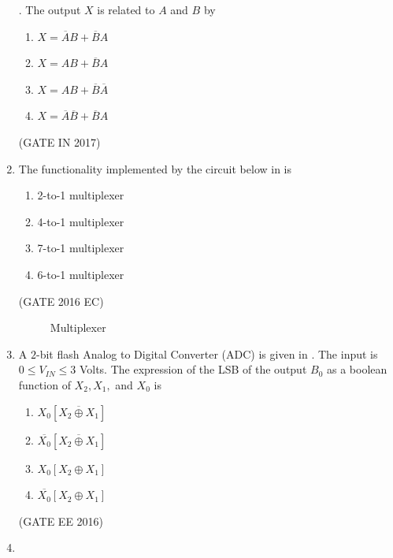 \begin{enumerate}[label=\arabic*.,ref=\theenumi]
.
	The output $X$ is related to $A$ and $B$ by 
\begin{enumerate}
\item $X = \overline{A}B + \overline{B}A$
\item $X = AB + \overline{B}A$
\item $X = AB + \overline{B}\overline{A}$
\item $X = \overline{A}\overline{B} + \overline{B}A$
\end{enumerate}
\hfill (GATE IN 2017)
\begin{figure}[H]
\centering
\resizebox{0.75\columnwidth}{!}{%

	}
\caption{}
\label{fig:gate_in_2017_30}
\end{figure}
\item The functionality implemented by the circuit below 
in
	is 
\begin{enumerate}
\item 2-to-1 multiplexer
\item 4-to-1 multiplexer
\item 7-to-1 multiplexer
\item 6-to-1 multiplexer
\end{enumerate}
\hfill (GATE 2016 EC)
%
\begin{figure}[H]
\centering
\resizebox{0.5\columnwidth}{!}{%

	}
\caption{Multiplexer}
\label{fig:gate_ec_2016_43}
\end{figure}
%
%
\item A $2$-bit flash Analog to Digital Converter (ADC) is given in . The input is $0 \leq V_{IN} \leq 3$ Volts. The expression of the LSB of the output $B_0$ as a boolean function of $X_2,X_1,$ and $X_0$ is 
\begin{enumerate}
\item $X_0 \left[ \overline {X_2 \oplus X_1} \right]$
\item $\overline {X_0} \left[ \overline {X_2 \oplus X_1} \right]$
\item $X_0 \left[ X_2 \oplus X_1 \right]$
\item $\overline{X_0} \left[ X_2 \oplus X_1 \right]$
\end{enumerate}
\hfill(GATE EE 2016)
\begin{figure}[H]
\centering
\resizebox{0.5\columnwidth}{!}{%

	}
\caption{}
\label{EE2016_37_fig1}
\end{figure}
\item 

\end{enumerate}
